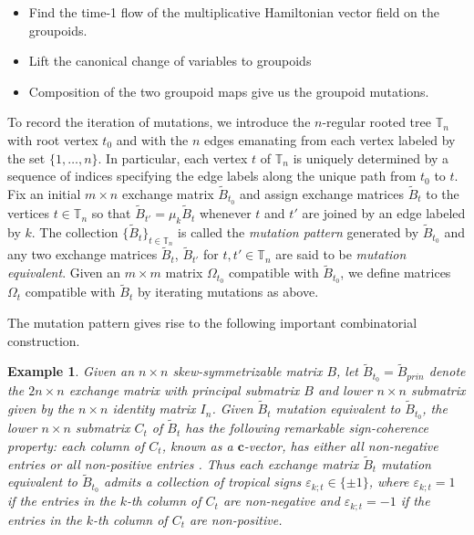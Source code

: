 \documentclass{amsart}
\newtheorem{example}[theorem]{Example}
\numberwithin{equation}{section}
\newcommand{\bfc}{\mathbf{c}}
\newcommand{\bfx}{\mathbf{x}}
\newcommand{\TT}{\mathbb{T}}
\begin{document}
\newpage

\begin{itemize}
\item Find the time-1 flow of the multiplicative Hamiltonian vector field on the groupoids.
\item Lift the canonical change of variables to groupoids
\item Composition of the two groupoid maps give us the groupoid mutations.
\end{itemize}

\newpage 

To record the iteration of mutations, we introduce the $n$-regular rooted tree $\TT_n$ with root vertex $t_0$ and with the $n$ edges emanating from each vertex labeled by the set $\{1,\ldots,n\}$.
In particular, each vertex $t$ of $\TT_n$ is uniquely determined by a sequence of indices specifying the edge labels along the unique path from $t_0$ to $t$.
Fix an initial $m\times n$ exchange matrix $\tilde B_{t_0}$ and assign exchange matrices $\tilde B_t$ to the vertices $t\in\TT_n$ so that $\tilde B_{t'}=\mu_k\tilde B_t$ whenever $t$ and $t'$ are joined by an edge labeled by $k$.
The collection $\{\tilde B_t\}_{t\in\TT_n}$ is called the \emph{mutation pattern} generated by $\tilde B_{t_0}$ and any two exchange matrices $\tilde B_t$, $\tilde B_{t'}$ for $t,t'\in\TT_n$ are said to be \emph{mutation equivalent}.
Given an $m\times m$ matrix $\Omega_{t_0}$ compatible with $\tilde B_{t_0}$, we define matrices $\Omega_t$ compatible with $\tilde B_t$ by iterating mutations as above.

The mutation pattern gives rise to the following important combinatorial construction.
\begin{example}
  Given an $n\times n$ skew-symmetrizable matrix $B$, let $\tilde B_{t_0}=\tilde B_{prin}$ denote the $2n\times n$ exchange matrix with principal submatrix $B$ and lower $n\times n$ submatrix given by the $n\times n$ identity matrix $I_n$.
  Given $\tilde B_t$ mutation equivalent to $\tilde B_{t_0}$, the lower $n\times n$ submatrix $C_t$ of $\tilde B_t$ has the following remarkable \emph{sign-coherence} property: each column of $C_t$, known as a $\bfc$-vector, has either all non-negative entries or all non-positive entries \cite{fomin-zelevinsky4,nakanishi-zelevinsky,gross-hacking-keel-kontsevich}.
  Thus each exchange matrix $\tilde B_t$ mutation equivalent to $\tilde B_{t_0}$ admits a collection of \emph{tropical signs} $\varepsilon_{k;t}\in\{\pm1\}$, where $\varepsilon_{k;t}=1$ if the entries in the $k$-th column of $C_t$ are non-negative and $\varepsilon_{k;t}=-1$ if the entries in the $k$-th column of $C_t$ are non-positive. 
\end{example}
\end{document}
